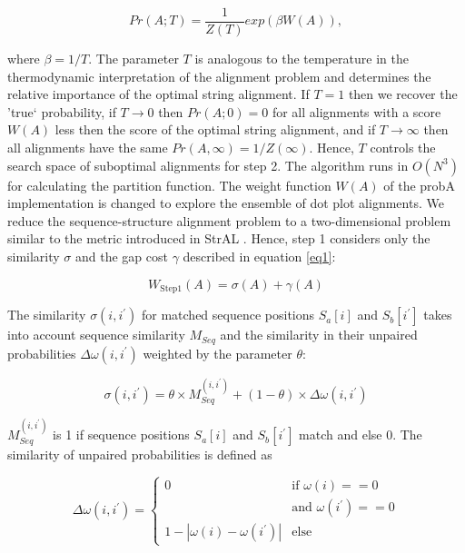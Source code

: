 \documentclass[a4paper,11pt]{article}
\begin{document}
\begin{equation}\label{probA}
	Pr(A;T) = \frac{1}{Z(T)} exp(\beta W(A)),
\end{equation}

\noindent where $\beta = 1 / T$. The parameter $T$ is analogous to the temperature in the
thermodynamic interpretation of the alignment problem and determines the
relative importance of the optimal string alignment. If $T=1$ then we recover the
'true` probability, if $T\to0$ then $Pr(A;0)=0$ for all alignments with a score
$W(A)$ less then the score of the optimal string alignment, and if $T\to\infty$ then
all alignments have the same $Pr(A,\infty)=1/Z(\infty)$.  Hence, $T$ controls
the search space of suboptimal alignments for step 2. The algorithm runs in
$O(N^3)$ for calculating the partition function. 
The weight function $W(A)$ of
the probA implementation is changed to explore the ensemble of dot plot
alignments. We reduce the sequence-structure alignment problem to a
two-dimensional problem similar to the metric introduced in StrAL
\cite{Dalli16613908}. Hence, step 1 considers only the similarity $\sigma$ and
the gap cost $\gamma$ described in equation \ref{eq1}:

\begin{equation}\label{wstep1}
	W_{\mbox{Step1}}(A) = \sigma(A) + \gamma(A)
\end{equation}

\noindent The similarity $\sigma(i,i^\prime)$ for matched sequence positions $S_a[i]$ and
$S_b[i^\prime]$ takes into account sequence similarity $M_{Seq}$ and the
similarity in their unpaired probabilities $\Delta \omega(i,i^\prime)$ weighted
by the parameter $\theta$:

\begin{equation}\label{sigmam}
	\sigma(i,i^\prime) = \theta \times
		M_{Seq}^{(i,i^\prime)} + (1-\theta) \times \Delta \omega(i,i^\prime)
\end{equation}

\noindent  $M_{Seq}^{(i,i^\prime)}$ is 1 if sequence positions $S_a[i]$ and
$S_b[i^\prime]$ match and else 0. The similarity of unpaired probabilities is
defined as

\begin{equation}\label{eq3}
	\Delta \omega(i,i^\prime) = \left\{ \begin{array}{cl}
			0 & \textrm{if } \omega(i) == 0 \\
			  & \textrm{and } \omega(i^\prime ) == 0 \\
			1 - | \omega(i) - \omega(i^\prime) | & \textrm{else}
		\end{array}\right.
\end{equation}
\end{document}
